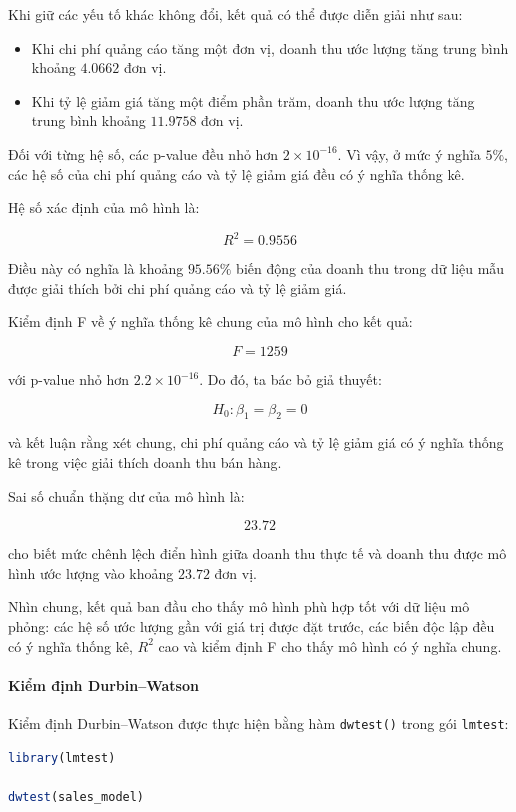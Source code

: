 Khi giữ các yếu tố khác không đổi, kết quả có thể được diễn giải như sau:

\begin{itemize}
    \item Khi chi phí quảng cáo tăng một đơn vị, doanh thu ước lượng tăng trung bình khoảng $4.0662$ đơn vị.
    
    \item Khi tỷ lệ giảm giá tăng một điểm phần trăm, doanh thu ước lượng tăng trung bình khoảng $11.9758$ đơn vị.
\end{itemize}

Đối với từng hệ số, các p-value đều nhỏ hơn $2\times10^{-16}$. Vì vậy, ở mức ý nghĩa $5\%$, các hệ số của chi phí quảng cáo và tỷ lệ giảm giá đều có ý nghĩa thống kê.

Hệ số xác định của mô hình là:

\[
R^2
=
0.9556
\]

Điều này có nghĩa là khoảng $95.56\%$ biến động của doanh thu trong dữ liệu mẫu được giải thích bởi chi phí quảng cáo và tỷ lệ giảm giá.

Kiểm định F về ý nghĩa thống kê chung của mô hình cho kết quả:

\[
F
=
1259
\]

với p-value nhỏ hơn $2.2\times10^{-16}$. Do đó, ta bác bỏ giả thuyết:

\[
H_0:
\beta_1
=
\beta_2
=
0
\]

và kết luận rằng xét chung, chi phí quảng cáo và tỷ lệ giảm giá có ý nghĩa thống kê trong việc giải thích doanh thu bán hàng.

Sai số chuẩn thặng dư của mô hình là:

\[
23.72
\]

cho biết mức chênh lệch điển hình giữa doanh thu thực tế và doanh thu được mô hình ước lượng vào khoảng $23.72$ đơn vị.

Nhìn chung, kết quả ban đầu cho thấy mô hình phù hợp tốt với dữ liệu mô phỏng: các hệ số ước lượng gần với giá trị được đặt trước, các biến độc lập đều có ý nghĩa thống kê, $R^2$ cao và kiểm định F cho thấy mô hình có ý nghĩa chung.

\paragraph{Kiểm định Durbin--Watson}

Kiểm định Durbin--Watson được thực hiện bằng hàm \texttt{dwtest()} trong
gói \texttt{lmtest}:

\begin{lstlisting}[language=R]
library(lmtest)

dwtest(sales_model)
\end{lstlisting}

